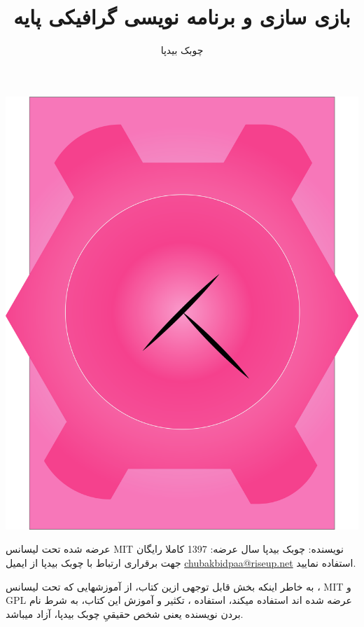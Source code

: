 \documentclass[14pt,a4paper]{memoir}
\begin{document}
		
		
		
\frontmatter
	
	\title{ بازی سازی و برنامه نویسی گرافیکی پایه}
	\author{چوبک بیدپا}
	\date{}
	\clearpage\maketitle
	\thispagestyle{empty}
	\includegraphics[scale=0.6]{Cover}	
	\newpage
	
		

	
	\begin{mybox}
		\begin{center} عرضه شده تحت لیسانس MIT
				\vfill
				نویسنده: چوبک بیدپا
				\vfill
				سال عرضه: 1397
				\vfill
				کاملا رایگان \vfill
				جهت برقراری ارتباط با چوبک بیدپا از ایمیل \url{chubakbidpaa@riseup.net} استفاده نمایید.
	\end{center}	


	\end{mybox}
 
 
	 \vfill
	 
	 به خاطر اینکه بخش قابل توجهی ازین کتاب، از آموزشهایی که تحت لیسانس ، MIT و GPL عرضه شده اند استفاده میکند، استفاده ، تکثیر و آموزش این کتاب، به شرط نام بردن نویسنده یعنی شخص حقیقیِ چوبک بیدپا، آزاد میباشد.
	 
\end{document}
